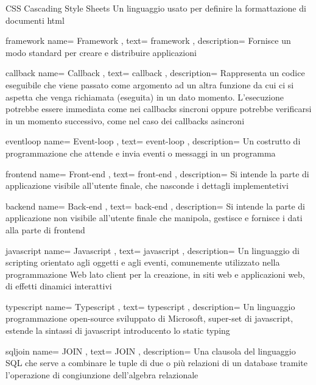 {CSS}
{Cascading Style Sheets}
{Un linguaggio usato per definire la formattazione di documenti \acrshort{html}}

\newglossaryentry
{framework}
{
	name={
		Framework
	},
	text={
		framework
	},
	description={
		Fornisce un modo standard per creare e distribuire applicazioni
	}
}

\newglossaryentry
{callback}
{
	name={
		Callback
	},
	text={
		callback
	},
	description={
		Rappresenta un codice eseguibile che viene passato come argomento ad un altra funzione da cui ci si aspetta che venga richiamata (eseguita) in un dato momento. L'esecuzione potrebbe essere immediata come nei callbacks sincroni oppure potrebbe verificarsi in un momento successivo, come nel caso dei callbacks asincroni
	}
}

\newglossaryentry
{eventloop}
{
	name={
		Event-loop
	},
	text={
		event-loop
	},
	description={
		Un costrutto di programmazione che attende e invia eventi o messaggi in un programma
	}
}

\newglossaryentry
{frontend}
{
	name={
		Front-end
	},
	text={
		front-end
	},
	description={
		Si intende la parte di applicazione visibile all'utente finale, che nasconde i dettagli implementetivi
	}
}

\newglossaryentry
{backend}
{
	name={
		Back-end
	},
	text={
		back-end
	},
	description={
		Si intende la parte di applicazione non visibile all'utente finale che manipola, gestisce e fornisce i dati alla parte di \gls{frontend}
	}
}

\newglossaryentry
{javascript}
{
	name={
		Javascript
	},
	text={
		javascript
	},
	description={
		Un linguaggio di scripting orientato agli oggetti e agli eventi, comunemente utilizzato nella programmazione Web lato client per la creazione, in siti web e applicazioni web, di effetti dinamici interattivi
	}
}

\newglossaryentry
{typescript}
{
	name={
		Typescript
	},
	text={
		typescript
	},
	description={
		Un linguaggio programmazione open-source sviluppato di Microsoft, super-set di \gls{javascript}, estende la sintassi di \gls{javascript} introducento lo static typing
	}
}

\newglossaryentry
{sqljoin}
{
name={
	JOIN
},
text={
	JOIN
},
description={
	Una clausola del linguaggio SQL che serve a combinare le tuple di due o più relazioni di un database tramite l'operazione di congiunzione dell'algebra relazionale
}
}
